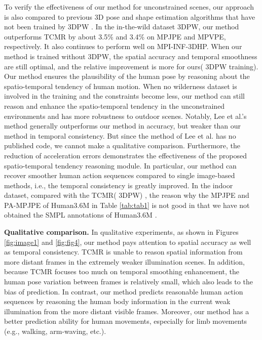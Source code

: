 \documentclass{bmvc2k}
\begin{document}
To verify the effectiveness of our method for unconstrained scenes, our approach is also compared to previous 3D pose and shape estimation algorithms that have not been trained by 3DPW \cite{von2018recovering}. In the in-the-wild dataset 3DPW, our method outperforms TCMR by about 3.5\% and 3.4\% on MPJPE and MPVPE, respectively. It also continues to perform well on MPI-INF-3DHP. When our method is trained without 3DPW, the spatial accuracy and temporal smoothness are still optimal, and the relative improvement is more for ours( 3DPW training). Our method ensures the plausibility of the human pose by reasoning about the spatio-temporal tendency of human motion. When no wilderness dataset is involved in the training and the constraints become less, our method can still reason and enhance the spatio-temporal tendency in the unconstrained environments and has more robustness to outdoor scenes. 
Notably, Lee et al.'s method \cite{Lee2021UncertaintyAwareHM} generally outperforms our method in accuracy, but weaker than our method in temporal consistency. But since the method of Lee et al. \cite{Lee2021UncertaintyAwareHM} has no published code, we cannot make a qualitative comparison.
Furthermore, the reduction of acceleration errors demonstrates the effectiveness of the proposed spatio-temporal tendency reasoning module. In particular, our method can recover smoother human action sequences compared to single image-based methods, i.e., the temporal consistency is greatly improved. In the indoor dataset, compared with the TCMR( 3DPW) \cite{choi2021beyond}, the reason why the MPJPE and PA-MPJPE of Human3.6M \cite{ionescu2013human3} in Table \ref{tab:tab1} is not good in that we have not obtained the SMPL annotations of Human3.6M \cite{ionescu2013human3}.


\textbf{Qualitative comparison.} In qualitative experiments, as shown in Figures \ref{fig:image1} and \ref{fig:fig4}, our method pays attention to spatial accuracy as well as temporal consistency. TCMR \cite{choi2021beyond} is unable to reason spatial information from more distant frames in the extremely weaker illumination scenes. In addition, because TCMR \cite{choi2021beyond} focuses too much on temporal smoothing enhancement, the human pose variation between frames is relatively small, which also leads to the bias of prediction. In contrast, our method predicts reasonable human action sequences by reasoning the human body information in the current weak illumination from the more distant visible frames. Moreover, our method has a better prediction ability for human movements, especially for limb movements (e.g., walking, arm-waving, etc.). 
\end{document}
